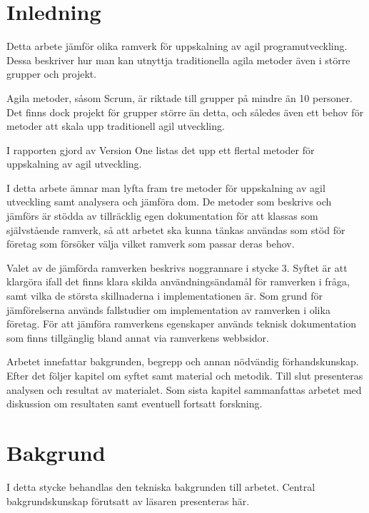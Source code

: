 \section{Inledning}
	
	Detta arbete jämför olika ramverk för uppskalning av agil programutveckling. Dessa beskriver hur man kan utnyttja traditionella agila metoder även i större grupper och projekt. 
	
	Agila metoder, såsom Scrum, är riktade till grupper på mindre än 10 personer\cite{scrum_guide}. Det finns dock projekt för grupper större än detta, och således även ett behov för metoder att skala upp traditionell agil utveckling.
	
	I rapporten gjord av Version One \cite{version_one_report} listas det upp ett flertal metoder för uppskalning av agil utveckling.
	
	I detta arbete ämnar man lyfta fram tre metoder för uppskalning av agil utveckling samt analysera och jämföra dom.
	De metoder som beskrivs och jämförs är stödda av tillräcklig egen dokumentation för att klassas som självstående ramverk, så att arbetet ska kunna tänkas användas som stöd för företag som försöker välja vilket ramverk som passar deras behov.
	
	Valet av de jämförda ramverken beskrivs noggrannare i stycke 3.
	Syftet är att klargöra ifall det finns klara skilda användningsändamål för ramverken i fråga, samt vilka de största skillnaderna i implementationen är. Som grund för jämförelserna används fallstudier om implementation av ramverken i olika företag. För att jämföra ramverkens egenskaper används teknisk dokumentation som finns tillgänglig bland annat via ramverkens webbsidor.
	
	Arbetet innefattar bakgrunden, begrepp och annan nödvändig förhandskunskap. Efter det följer kapitel om syftet samt material och metodik. Till slut presenteras analysen och resultat av materialet. Som sista kapitel sammanfattas arbetet med diskussion om resultaten samt eventuell fortsatt forskning.
	
	
\newpage
\section{Bakgrund}
	
	I detta stycke behandlas den tekniska bakgrunden till arbetet. Central bakgrundskunskap förutsatt av läsaren presenteras här.
	

